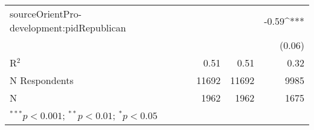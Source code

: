 \begin{table}[h!]
\begin{center}
\begin{footnotesize}
\begin{tabular}{l D{.}{.}{5.5} D{.}{.}{5.5} D{.}{.}{4.5}}
sourceOrientPro-development:pidRepublican &            &             & -0.59^{***} \\
                                          &            &             & (0.06)      \\
\midrule
R$^2$                                     & 0.51       & 0.51        & 0.32        \\
N Respondents                             & 11692      & 11692       & 9985        \\
N                                         & 1962       & 1962        & 1675        \\
\bottomrule
{}
\end{tabular}
\end{footnotesize}
\label{table:ra-source-interact}
\end{center}
\end{table} 
